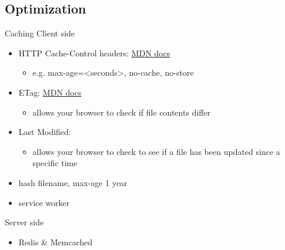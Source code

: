 \documentclass{beamer}
\begin{document}
\subsection{Optimization}

\begin{frame}{Caching}
  Client side
  \begin{itemize}
    \item HTTP Cache-Control headers:
      {\scriptsize
      \href{https://developer.mozilla.org/en-US/docs/Web/HTTP/Headers/Cache-Control}{MDN
      docs}}
      \begin{itemize}
        \item e.g. max-age=<seconds>, no-cache, no-store
      \end{itemize}
    \item ETag:
      {\scriptsize
      \href{https://developer.mozilla.org/en-US/docs/Web/HTTP/Headers/ETag}{MDN
      docs}}
      \begin{itemize}
        \item allows your browser to check if file contents differ
      \end{itemize}
    \item Last Modified:
      \begin{itemize}
        \item allows your browser to check to see if a file has been updated
          since a specific time
      \end{itemize}
    \item hash filename, max-age 1 year
    \item service worker
  \end{itemize}
  Server side
  \begin{itemize}
    \item Redis \& Memcached
  \end{itemize}
\end{frame}
\end{document}
